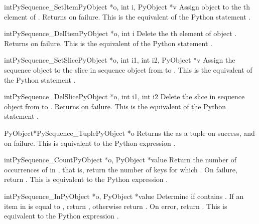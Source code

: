 \documentclass{manual}
\begin{document}
\begin{cfuncdesc}{int}{PySequence_SetItem}{PyObject *o, int i, PyObject *v}
Assign object  to the th element of .
Returns  on failure.  This is the equivalent of the Python
statement .
\end{cfuncdesc}

\begin{cfuncdesc}{int}{PySequence_DelItem}{PyObject *o, int i}
Delete the th element of object .  Returns
 on failure.  This is the equivalent of the Python
statement .
\end{cfuncdesc}

\begin{cfuncdesc}{int}{PySequence_SetSlice}{PyObject *o, int i1, int i2, PyObject *v}
Assign the sequence object  to the slice in sequence
object  from  to .  This is the equivalent of
the Python statement .
\end{cfuncdesc}

\begin{cfuncdesc}{int}{PySequence_DelSlice}{PyObject *o, int i1, int i2}
Delete the slice in sequence object  from  to .
Returns  on failure. This is the equivalent of the Python
statement .
\end{cfuncdesc}

\begin{cfuncdesc}{PyObject*}{PySequence_Tuple}{PyObject *o}
Returns the  as a tuple on success, and \NULL{} on failure.
This is equivalent to the Python expression .
\end{cfuncdesc}

\begin{cfuncdesc}{int}{PySequence_Count}{PyObject *o, PyObject *value}
Return the number of occurrences of  in , that is,
return the number of keys for which .  On failure, return .  This is equivalent to
the Python expression .
\end{cfuncdesc}

\begin{cfuncdesc}{int}{PySequence_In}{PyObject *o, PyObject *value}
Determine if  contains .  If an item in  is
equal to , return , otherwise return .  On
error, return .  This is equivalent to the Python expression
.
\end{cfuncdesc}
\end{document}
